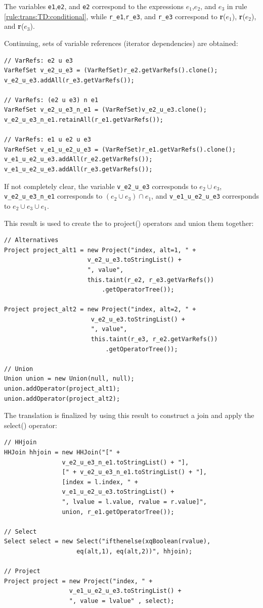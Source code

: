 The variables \texttt{e1},\texttt{e2}, and \texttt{e2} correspond to the
expressions $e_1$,$e_2$, and $e_3$ in rule \ref{rule:trans:TD:conditional},
while \texttt{r\_e1},\texttt{r\_e3}, and \texttt{r\_e3} correspond to
\textbf{r}($e_1$), \textbf{r}($e_2$), and \textbf{r}($e_3$).

Continuing, sets of variable references (iterator dependencies) are obtained:
         
\begin{Verbatim}
// VarRefs: e2 u e3
VarRefSet v_e2_u_e3 = (VarRefSet)r_e2.getVarRefs().clone();
v_e2_u_e3.addAll(r_e3.getVarRefs());

// VarRefs: (e2 u e3) n e1
VarRefSet v_e2_u_e3_n_e1 = (VarRefSet)v_e2_u_e3.clone();
v_e2_u_e3_n_e1.retainAll(r_e1.getVarRefs());

// VarRefs: e1 u e2 u e3
VarRefSet v_e1_u_e2_u_e3 = (VarRefSet)r_e1.getVarRefs().clone();
v_e1_u_e2_u_e3.addAll(r_e2.getVarRefs());
v_e1_u_e2_u_e3.addAll(r_e3.getVarRefs());
\end{Verbatim}

If not completely clear, the variable \texttt{v\_e2\_u\_e3} corresponds to
$e_2 \cup e_3$, \texttt{v\_e2\_u\_e3\_n\_e1} corresponds to $(e_2 \cup e_3) \cap
e_1$, and \texttt{v\_e1\_u\_e2\_u\_e3} corresponds to $e_2 \cup e_3 \cup
e_1$.

This result is used to create the to \textsf{project()} operators and union
them together:

\begin{Verbatim}
// Alternatives
Project project_alt1 = new Project("index, alt=1, " + 
                       v_e2_u_e3.toStringList() + 
                       ", value", 
                       this.taint(r_e2, r_e3.getVarRefs())
                           .getOperatorTree()); 

Project project_alt2 = new Project("index, alt=2, " +
                        v_e2_u_e3.toStringList() + 
                        ", value", 
                        this.taint(r_e3, r_e2.getVarRefs())
                            .getOperatorTree()); 

// Union
Union union = new Union(null, null);
union.addOperator(project_alt1);
union.addOperator(project_alt2);
\end{Verbatim}

The translation is finalized by using this result to construct a join and apply
the \textsf{select()} operator:

\begin{Verbatim}
// HHjoin
HHJoin hhjoin = new HHJoin("[" + 
                v_e2_u_e3_n_e1.toStringList() + "],
                [" + v_e2_u_e3_n_e1.toStringList() + "], 
                [index = l.index, " + 
                v_e1_u_e2_u_e3.toStringList() +
                ", lvalue = l.value, rvalue = r.value]", 
                union, r_e1.getOperatorTree());

// Select
Select select = new Select("ifthenelse(xqBoolean(rvalue), 
                    eq(alt,1), eq(alt,2))", hhjoin);

// Project
Project project = new Project("index, " + 
                  v_e1_u_e2_u_e3.toStringList() +
                  ", value = lvalue" , select);
\end{Verbatim}
